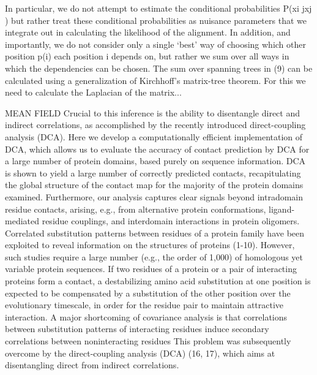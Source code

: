 	In particular, we do not attempt to estimate the conditional probabilities P(xi jxj ) but rather treat these conditional probabilities as nuisance parameters that we integrate out in calculating the likelihood of the alignment. \cite{burger2010disentangling}
	In addition, and importantly, we do not consider only a single `best' way of choosing which other position p(i) each position i depends on, but rather we sum over all ways in which the dependencies can be chosen.  \cite{burger2010disentangling}
	The sum over spanning trees in (9) can be calculated using a generalization of Kirchhoff's matrix-tree theorem. For this we need to calculate the Laplacian of the matrix... \cite{burger2010disentangling}




MEAN FIELD
Crucial to this inference is the ability to disentangle direct and indirect correlations, as accomplished by the recently introduced direct-coupling analysis (DCA). Here we develop a computationally efficient implementation of DCA, which allows us to evaluate the accuracy of contact prediction by DCA for a large number of protein domains, based purely on sequence information. \cite{morcos2011direct}
DCA is shown to yield a large number of correctly predicted contacts, recapitulating the global structure of the contact map for the majority of the protein domains examined.  \cite{morcos2011direct}
Furthermore, our analysis captures clear signals beyond intradomain residue contacts, arising, e.g., from alternative protein conformations, ligand-mediated residue couplings, and interdomain interactions in protein oligomers. \cite{morcos2011direct}
Correlated substitution patterns between residues of a protein family have been exploited to reveal information on the structures of proteins (1-10).  \cite{morcos2011direct}
However, such studies require a large number (e.g., the order of 1,000) of homologous yet variable protein sequences.  \cite{morcos2011direct}
If two residues of a protein or a pair of interacting proteins form a contact, a destabilizing amino acid substitution at one position is expected to be compensated by a substitution of the other position over the evolutionary timescale, in order for the residue pair to maintain attractive interaction.  \cite{morcos2011direct}
A major shortcoming of covariance analysis is that correlations between substitution patterns of interacting residues induce secondary correlations between noninteracting residues \cite{morcos2011direct}
This problem was subsequently overcome by the direct-coupling analysis (DCA) (16, 17), which aims at disentangling direct from indirect correlations.  \cite{morcos2011direct}
